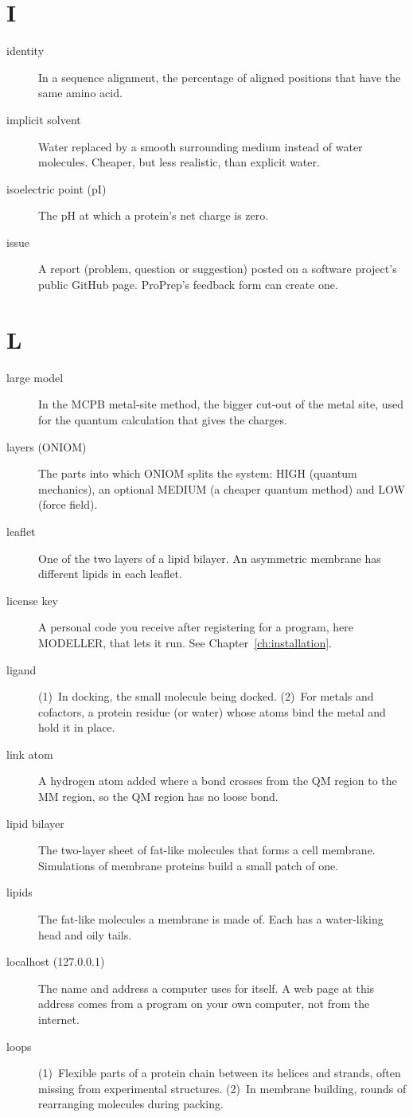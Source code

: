 \section*{I}

\begin{description}
\item[identity] In a sequence alignment, the percentage of aligned positions
  that have the same amino acid.
\item[implicit solvent] Water replaced by a smooth surrounding medium instead
  of water molecules. Cheaper, but less realistic, than explicit water.
\item[isoelectric point (pI)] The pH at which a protein's net charge is zero.
\item[issue] A report (problem, question or suggestion) posted on a software
  project's public GitHub page. ProPrep's feedback form can create one.
\end{description}

\section*{L}

\begin{description}
\item[large model] In the MCPB metal-site method, the bigger cut-out of the
  metal site, used for the quantum calculation that gives the charges.
\item[layers (ONIOM)] The parts into which ONIOM splits the system: HIGH
  (quantum mechanics), an optional MEDIUM (a cheaper quantum method) and LOW
  (force field).
\item[leaflet] One of the two layers of a lipid bilayer. An asymmetric
  membrane has different lipids in each leaflet.
\item[license key] A personal code you receive after registering for a
  program, here MODELLER, that lets it run. See
  Chapter~\ref{ch:installation}.
\item[ligand] (1)~In docking, the small molecule being docked. (2)~For metals
  and cofactors, a protein residue (or water) whose atoms bind the metal and
  hold it in place.
\item[link atom] A hydrogen atom added where a bond crosses from the QM region
  to the MM region, so the QM region has no loose bond.
\item[lipid bilayer] The two-layer sheet of fat-like molecules that forms a
  cell membrane. Simulations of membrane proteins build a small patch of one.
\item[lipids] The fat-like molecules a membrane is made of. Each has a
  water-liking head and oily tails.
\item[localhost (127.0.0.1)] The name and address a computer uses for itself.
  A web page at this address comes from a program on your own computer, not
  from the internet.
\item[loops] (1)~Flexible parts of a protein chain between its helices and
  strands, often missing from experimental structures. (2)~In membrane
  building, rounds of rearranging molecules during packing.
\end{description}

